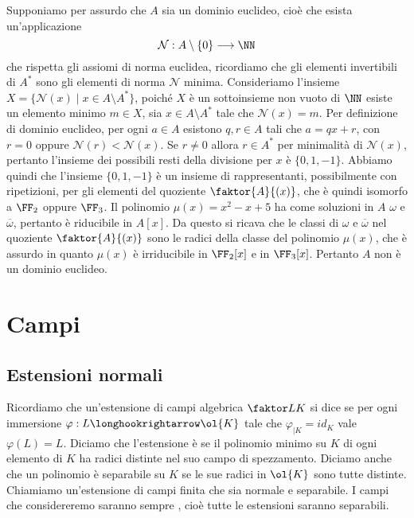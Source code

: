 \documentclass[11pt]{scrartcl}
\begin{document}
	Supponiamo per assurdo che $A$ sia un dominio euclideo, cioè che esista
	un'applicazione 
	\[
	\mathcal{N}: A\setminus \{0\} \longrightarrow \NN
	\]
	che rispetta gli assiomi di norma euclidea, ricordiamo che gli elementi 
	invertibili di $A^*$ sono gli elementi di norma $\mathcal{N}$ minima. 
	Consideriamo l'insieme $X = \{\mathcal{N}(x)\mid x \in A\setminus A^*\}$,
	poiché $X$ è un sottoinsieme non vuoto di $\NN$ esiste un elemento minimo 
	$m \in X$, sia $x \in A\setminus A^*$ tale che $\mathcal{N}(x) = m$.
	Per definizione di dominio euclideo, per ogni $a \in A$ esistono $q, r \in A$
	tali che $a = qx + r$, con $r = 0$ oppure $\mathcal{N}(r) < \mathcal{N}(x)$.
	Se $r \neq 0$ allora $r \in A^*$ per minimalità di $\mathcal{N}(x)$, pertanto 
	l'insieme dei possibili resti della divisione per $x$ è $\{0, 1, -1\}$.
	Abbiamo quindi che l'insieme $\{0, 1, -1\}$ è un insieme di rappresentanti, 
	possibilmente con ripetizioni, per gli elementi del quoziente $\faktor{A}{(x)}$,
	che è quindi isomorfo a $\FF_2$ oppure $\FF_3$.\newline
	Il polinomio $\mu(x) = x^2 - x + 5$ ha come soluzioni in $A$ $\omega$ e $\overline{\omega}$,
	pertanto è riducibile in $A[x]$. Da questo si ricava che le classi di $\omega$
	e $\overline{\omega}$ nel quoziente $\faktor{A}{(x)}$ sono le radici della 
	classe del polinomio $\mu(x)$, che è assurdo in quanto $\mu(x)$ è irriducibile
	in $\FF_2[x]$ e in $\FF_3[x]$. Pertanto $A$ non è un dominio euclideo.
	
	\newpage
	
	\section{Campi}
	
	\subsection{Estensioni normali}
	
	Ricordiamo che un'estensione di campi algebrica $\faktor L K$ si dice 
	 se per ogni immersione $\varphi: L\longhookrightarrow \ol{K}$
	tale che $\varphi_{\mid K} = id_K$ vale $\varphi(L) = L$. Diciamo che 
	l'estensione è  se il polinomio minimo su $K$ di ogni elemento
	di $K$ ha radici distinte nel suo campo di spezzamento. Diciamo anche che un 
	polinomio è separabile su $K$ se le sue radici in $\ol{K}$ sono tutte distinte. 
	Chiamiamo  un'estensione di campi finita che sia 
	normale e separabile. I campi che considereremo saranno sempre ,
	cioè tutte le estensioni saranno separabili.
	
\end{document}
